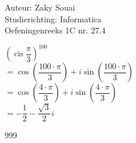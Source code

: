 \documentclass[a4paper]{article}
\begin{document}
  
\noindent \large Auteur: Zaky Souai \\
\noindent \large Studierichting: Informatica\\
\noindent \large Oefeningenreeks 1C nr. 27.4\\

\medskip

\normalsize

$ \left(\operatorname{cis} \dfrac{\pi}{3} \right)^{100} $ \\

$ = \cos \left( \dfrac{100 \cdot \pi}{3} \right) + i \sin \left( \dfrac{100 \cdot \pi}{3} \right) $ \\

$ = \cos \left( \dfrac{4 \cdot \pi}{3} \right) + i \sin \left( \dfrac{4 \cdot \pi}{3} \right) $ \\

$ = - \dfrac{1}{2} - \dfrac{\sqrt{3}}{2} i $ \\

\begin{thebibliography}{999}
\end{thebibliography}
\end{document}
